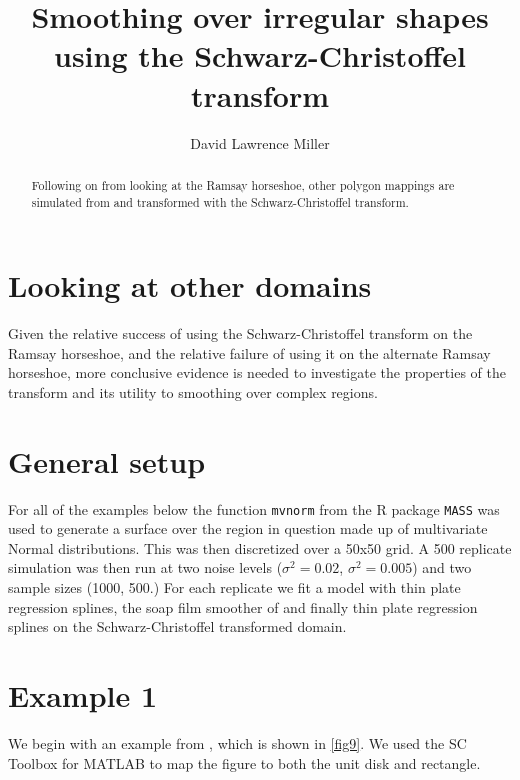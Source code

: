 \documentclass[a4paper,10pt]{amsart}
\title{Smoothing over irregular shapes using the Schwarz-Christoffel transform}
\author{David Lawrence Miller}
\newcommand{\sch}{Schwarz-Christoffel }
\begin{document}
\begin{abstract}
Following on from looking at the Ramsay horseshoe, other polygon mappings are simulated from and transformed with the \sch transform.
\end{abstract}


\newtheorem{thm}{Theorem}[section]

\newtheorem{defn}{Definition}[section]

\maketitle



\section{Looking at other domains}

Given the relative success of using the \sch transform on the Ramsay horseshoe, and the relative failure of using it on the alternate Ramsay horseshoe, more conclusive evidence is needed to investigate the properties of the transform and its utility to smoothing over complex regions.





\section{General setup}

For all of the examples below the function \texttt{mvnorm} from the \textsf{R} package \texttt{MASS} was used to generate a surface over the region in question made up of multivariate Normal distributions. This was then discretized over a 50x50 grid. A 500 replicate simulation was then run at two noise levels ($\sigma^2=0.02$, $\sigma^2=0.005$) and two sample sizes (1000, 500.) For each replicate we fit a model with thin plate regression splines, the soap film smoother of \cite{soap} and finally thin plate regression splines on the \sch transformed domain.






\section{Example 1}

We begin with an example from \cite{miller09}, which is shown in \ref{fig9}. We used the SC Toolbox for MATLAB to map the figure to both the unit disk and rectangle.
\end{document}
